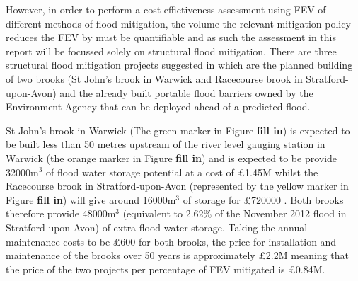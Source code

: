 \documentclass[11pt,a4paper]{article}
\begin{document}
However, in order to perform a cost effictiveness assessment using FEV of different methods of flood mitigation, the volume the relevant mitigation policy reduces the FEV by must be quantifiable and as such the assessment in this report will be focussed solely on structural flood mitigation. There are three structural flood mitigation projects suggested in \cite{war1} which are the planned building of two brooks (St John's brook in Warwick and Racecourse brook in Stratford-upon-Avon) and the already built portable flood barriers owned by the Environment Agency that can be deployed ahead of a predicted flood.

St John's brook in Warwick (The green marker in Figure \textbf{fill in}) is expected to be built less than 50 metres upstream of the river level gauging station in Warwick (the orange marker in Figure \textbf{fill in}) and is expected to be provide 32000m$^3$ of flood water storage potential at a cost of \pounds1.45M whilst the Racecourse brook in Stratford-upon-Avon (represented by the yellow marker in Figure \textbf{fill in}) will give around 16000m$^3$ of storage for \pounds720000 \cite{brook}. Both brooks therefore provide 48000m$^3$ (equivalent to 2.62\% of the November 2012 flood in Stratford-upon-Avon) of extra flood water storage. Taking the annual maintenance costs to be \pounds600 \cite{cost4} for both brooks, the price for installation and maintenance of the brooks over 50 years is approximately \pounds2.2M meaning that the price of the two projects per percentage of FEV mitigated is \pounds0.84M.
\end{document}
